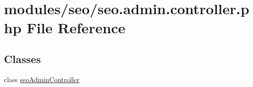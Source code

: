 \hypertarget{seo_8admin_8controller_8php}{\section{modules/seo/seo.admin.\-controller.\-php File Reference}
\label{seo_8admin_8controller_8php}
}
\subsection*{Classes}
\begin{DoxyCompactItemize}
\item 
class \hyperlink{classseoAdminController}{seo\-Admin\-Controller}
\end{DoxyCompactItemize}
